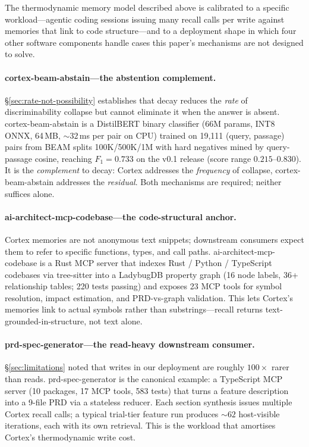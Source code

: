 \documentclass[11pt]{article}
\begin{document}
The thermodynamic memory model described above is calibrated to a
specific workload---agentic coding sessions issuing many recall
calls per write against memories that link to code structure---and
to a deployment shape in which four other software components
handle cases this paper's mechanisms are not designed to solve.

\paragraph{cortex-beam-abstain---the abstention complement.}
\S\ref{sec:rate-not-possibility} establishes that decay reduces the
\emph{rate} of discriminability collapse but cannot eliminate it
when the answer is absent.  cortex-beam-abstain \citep{Deust2026a}
is a DistilBERT binary classifier (66M params, INT8 ONNX, 64\,MB,
${\sim}32$\,ms per pair on CPU) trained on 19{,}111 (query, passage)
pairs from BEAM splits 100K/500K/1M with hard negatives mined by
query-passage cosine, reaching $F_1 = 0.733$ on the v0.1 release
(score range $0.215$--$0.830$).  It is the \emph{complement} to
decay: Cortex addresses the \emph{frequency} of collapse,
cortex-beam-abstain addresses the \emph{residual}.  Both mechanisms
are required; neither suffices alone.

\paragraph{ai-architect-mcp-codebase---the code-structural anchor.}
Cortex memories are not anonymous text snippets; downstream
consumers expect them to refer to specific functions, types, and
call paths.  ai-architect-mcp-codebase \citep{Deust2026b} is a Rust MCP
server that indexes Rust / Python / TypeScript codebases via
tree-sitter into a LadybugDB property graph (16 node labels, 36+
relationship tables; 220 tests passing) and exposes 23 MCP tools
for symbol resolution, impact estimation, and PRD-vs-graph
validation.  This lets Cortex's memories link to actual symbols
rather than substrings---recall returns text-grounded-in-structure,
not text alone.

\paragraph{prd-spec-generator---the read-heavy downstream consumer.}
\S\ref{sec:limitations} noted that writes in our deployment are
roughly $100\times$ rarer than reads.  prd-spec-generator
\citep{Deust2026c} is the canonical example: a TypeScript MCP
server (10 packages, 17 MCP tools, 583 tests) that turns a feature
description into a 9-file PRD via a stateless reducer.  Each
section synthesis issues multiple Cortex recall calls; a typical
trial-tier feature run produces ${\sim}62$ host-visible iterations,
each with its own retrieval.  This is the workload that amortises
Cortex's thermodynamic write cost.
\end{document}
